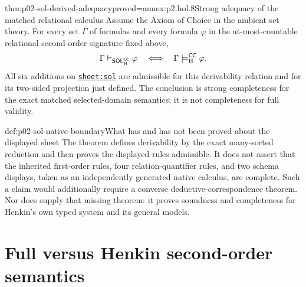 \begin{hbtheorem}{thm:p02-sol-derived-adequacy}{proved=annex:p2.hol.8}{Strong adequacy of the matched relational calculus}
Assume the Axiom of Choice in the ambient set theory.  For every set
\(\Gamma\) of formulas and every formula \(\varphi\) in the at-most-countable
relational second-order signature fixed above,
\[
 \Gamma\vdash_{\mathsf{SOL}_{\mathrm H}^{\mathsf{CC}}}\varphi
 \quad\Longleftrightarrow\quad
 \Gamma\models_{\mathrm H}^{\mathsf{CC}}\varphi.
\]
All six additions on \hyperref[sheet:sol]{\texttt{sheet:sol}} are admissible
for this derivability relation and for its two-sided projection just defined.
The conclusion is
strong completeness for the exact matched
selected-domain semantics; it is not completeness for full validity.
\end{hbtheorem}

\begin{proofboundary}{def:p02-sol-native-boundary}{What has and has not been proved about the displayed sheet}
The theorem defines derivability by the exact many-sorted reduction and then
proves the displayed rules admissible.  It does not assert that the inherited
first-order rules, four relation-quantifier rules, and two schema displays,
taken as an independently generated native calculus, are complete.  Such a
claim would additionally require a converse deductive-correspondence theorem.
Nor does \cite{Henkin1950} supply that missing theorem: it proves soundness and
completeness for Henkin's own typed system and its general models.
\end{proofboundary}


\section{Full versus Henkin second-order semantics}
\label{sec:p02-sol-comparison}

